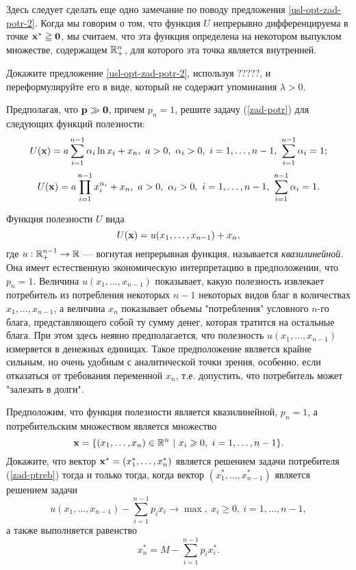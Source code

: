     Здесь следует сделать еще одно замечание по поводу предложения
    \ref{usl-opt-zad-potr-2}. Когда мы говорим о том, что функция $U$ непрерывно
    дифференцируема в точке $\mathbf{x^{*}}\geqq\mathbf{0}$, мы считаем,
    что эта функция определена на некотором выпуклом множестве,
    содержащем $\mathbb{R}_{+}^{n}$, для которого эта точка является
    внутренней.


\begin{exer}
    Докажите предложение \ref{usl-opt-zad-potr-2}, используя ?????, и переформулируйте
    его в виде, который не содержит упоминания $\lambda>0$.
\end{exer}



\begin{exer}
    Предполагая, что $\mathbf{p}\gg\mathbf{0}$, причем $p_{n}=1$, решите задачу (\ref{zad-potr})
    для следующих функций полезности:
    \[U(\mathbf{x})=a\sum_{i=1}^{n-1}\alpha_{i}\ln x_{i}+x_{n}, \ a>0, \ \alpha_{i}>0, \
     i=1,\ldots,n-1, \ \sum_{i=1}^{n-1}\alpha_{i}=1;\]
    \[U(\vc{x})=a\prod_{i=1}^{n-1}x_{i}^{\alpha_{i}}+x_{n}, \ a>0,
     \ \alpha_{i}>0, \ i=1,\ldots,n-1,  \ \sum_{i=1}^{n-1}\alpha_{i}=1.\]
\end{exer}

    Функция полезности $U$ вида
    \[U(\mathbf{x})=u(x_{1},\ldots,x_{n-1})+x_{n},\]
    где $u:\mathbb{R}^{n-1}_{+}\rightarrow\mathbb{R}$ --- вогнутая непрерывная
    функция,
    называется \emph{квазилинейной}. Она имеет естественную
    экономическую интерпретацию в предположении, что $p_{n}=1$.
    Величина $u(x_{1},\ldots,x_{n-1})$
    показывает, какую полезность извлекает потребитель из
    потребления некоторых $n-1$ некоторых видов благ в количествах
    $x_{1},\ldots,x_{n-1}$, а величина $x_{n}$ показывает объемы
    "потребления" условного $n$-го блага, представляющего собой ту
    сумму денег, которая тратится на остальные блага. При этом здесь
    неявно предполагается, что полезность $u(x_{1},\ldots,x_{n-1})$
    измеряется в денежных единицах. Такое предположение является
    крайне сильным, но очень удобным с аналитической точки зрения,
    особенно, если отказаться от требования переменной $x_{n}$, т.е.
    допустить, что потребитель может "залезать в долги".


\begin{exer}
    Предположим, что функция полезности является квазилинейной,
    $p_{n}=1$, а потребительским множеством является множество
    \[\vc{x}=\{(x_{1},\ldots,x_{n})\in\R^{n} \ | \ x_{i}\geqslant0, \ i=1,\ldots,n-1\}.\]
    Докажите, что вектор
    $\mathbf{x^{*}}=(x_{1}^{*},\ldots,x_{n}^{*})$ является
    решением задачи потребителя (\ref{zad-ptreb}) тогда и только
    тогда, когда вектор $(x_{1}^{*},\ldots,x_{n-1}^{*})$
    является решением задачи
    \[u(x_{1},\ldots,x_{n-1})-\sum_{i=1}^{n-1}p_{i}x_{i}\rightarrow\max, \
    x_{i}\geqslant0, \ i=1,\ldots,n-1,\]
    а также выполняется равенство
    \[x_{n}^{*}=M-\sum_{i=1}^{n-1}p_{i}x_{i}^{*}.\]
\end{exer}







